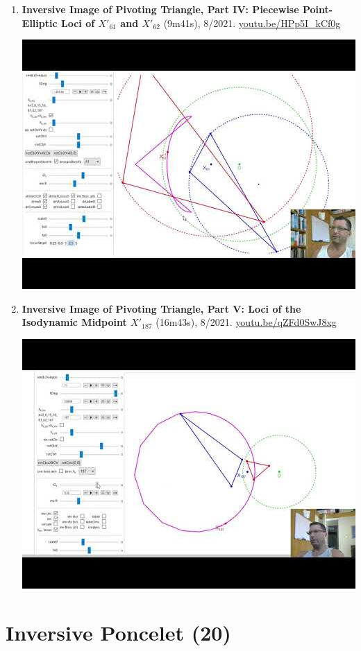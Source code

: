 \documentclass[12pt]{article}
\begin{document}
\begin{enumerate}[resume]
% 
\item \textbf{Inversive Image of Pivoting Triangle, Part IV: Piecewise Point-Elliptic Loci of $X'_{61}$ and $X'_{62}$} (9m41s), 8/2021. \href{https://youtu.be/HPp5I_kCf0g}{\url{youtu.be/HPp5I\_kCf0g}}
\begin{center}\includegraphics[width=.5\textwidth]{pics/HPp5I_kCf0g.jpg}\end{center}
% 
\item \textbf{Inversive Image of Pivoting Triangle, Part V: Loci of the Isodynamic Midpoint $X'_{187}$} (16m43s), 8/2021. \href{https://youtu.be/qZFd0SwJ8xg}{\url{youtu.be/qZFd0SwJ8xg}}
\begin{center}\includegraphics[width=.5\textwidth]{pics/qZFd0SwJ8xg.jpg}\end{center}
% 
\end{enumerate}

\section{Inversive Poncelet (20)}
\end{document}
